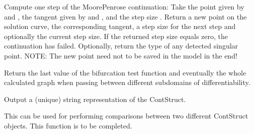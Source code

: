 \documentclass[a4paper,11pt,english]{sphinxmanual}
\begin{document}
\begin{fulllineitems}
\begin{fulllineitems}
\label{\detokenize{python/cmdref_ContStruct:getfem.ContStruct.Moore_Penrose_continuation}}
Compute one step of the Moore\sphinxhyphen{}Penrose continuation: Take the point
given by  and , the tangent given by 
and , and the step size . Return a new point on the
solution curve, the corresponding tangent, a step size for the next
step and optionally the current step size. If the returned step
size equals zero, the continuation has failed. Optionally, return
the type of any detected singular point.
NOTE: The new point need not to be saved in the model in the end!

\end{fulllineitems}


\begin{fulllineitems}
\label{\detokenize{python/cmdref_ContStruct:getfem.ContStruct.bifurcation_test_function}}
Return the last value of the bifurcation test function and eventually
the whole calculated graph when passing between different sub\sphinxhyphen{}domains
of differentiability.

\end{fulllineitems}


\begin{fulllineitems}
\label{\detokenize{python/cmdref_ContStruct:getfem.ContStruct.char}}
Output a (unique) string representation of the ContStruct.

This can be used for performing comparisons between two
different ContStruct objects.
This function is to be completed.

\end{fulllineitems}



\end{fulllineitems}
\end{document}
